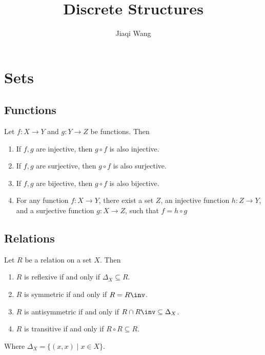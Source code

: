 \documentclass{classnotes}
\author{Jiaqi Wang}
\title{Discrete Structures}
\begin{document}
\maketitle

\section{Sets}
\subsection{Functions}
\begin{proposition}
    Let $f: X \to Y$ and $g: Y \to Z$ be functions. Then
    \begin{enumerate}[label=(\roman*)]
        \item If $f,g$ are injective, then $g \circ f$ is also injective.
        \item If $f,g$ are surjective, then $g \circ f$ is also surjective.
        \item If $f,g$ are bijective, then $g \circ f$ is also bijective.
        \item For any function $f: X \to Y$, there exist a set $Z$, an injective 
            function $h: Z\to Y$, and a surjective function $g: X \to Z$, such that $f = h \circ g$
    \end{enumerate}
\end{proposition}
\subsection{Relations}
\begin{proposition}
    Let $R$ be a relation on a set $X$. Then
    \begin{enumerate}
        \item $R$ is reflexive if and only if $\Delta_X \subseteq R$. 
        \item $R$ is symmetric if and only if $R = R\inv$.
        \item $R$ is antisymmetric if and only if $R \cap R\inv \subseteq \Delta_X$.
        \item $R$ is transitive if and only if $R \circ R \subseteq R$.
    \end{enumerate}
    Where $\Delta_X = \{(x,x) \mid x \in X\}$.
\end{proposition}
\end{document}
